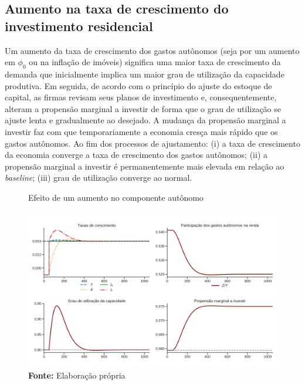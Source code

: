 \subsection*{Aumento na taxa de crescimento do investimento residencial}


Um aumento da taxa de crescimento dos gastos autônomos (seja por um aumento em $\phi_0$ ou na inflação de imóveis) significa uma maior taxa de crescimento da demanda que inicialmente implica um maior grau de utilização da capacidade produtiva. Em seguida, de acordo com o princípio do ajuste do estoque de capital, as firmas revisam seus planos de investimento e, consequentemente, alteram a propensão marginal a investir de forma que o grau de utilização se ajuste lenta e gradualmente ao desejado. A mudança da propensão marginal a investir faz com que temporariamente a economia cresça mais rápido que os gastos autônomos. Ao fim dos processos de ajustamento: (i) a taxa de crescimento da economia converge a taxa de crescimento dos gastos autônomos; (ii) a propensão marginal a investir é permanentemente mais elevada em relação ao \textit{baseline}; (iii) grau de utilização converge ao normal.



\begin{figure}[H]
	\centering
	\caption{Efeito de um aumento no componente autônomo}
	\label{choque_1}
	\includegraphics[width=\textwidth]{../../Modelo/Versoes/Shock_1.png}
	\caption*{\textbf{Fonte:} Elaboração própria}
\end{figure}


